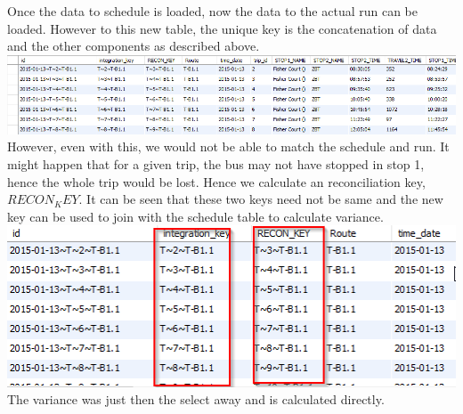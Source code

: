 \documentclass[12pt]{article}\usepackage[]{graphicx}\usepackage[]{color}
\begin{document}
Once the data to schedule is loaded, now the data to the actual run can be loaded. However to this new table, the unique key is the concatenation of data and the other components as described above. \\
\includegraphics[scale=0.6]{resources/wh2}\\[1cm] 
However, even with this, we would not be able to match the schedule and run. It might happen that for a given trip, the bus may not have stopped in stop 1, hence the whole trip would be lost. Hence we calculate an reconciliation key, $RECON_KEY$. It can be seen that these two keys need not be same and the new key can be used to join with the schedule table to calculate variance. \\
\includegraphics[scale=0.6]{resources/wh3}\\[1cm] 
The variance was just then the select away and is calculated directly.

\end{document}
